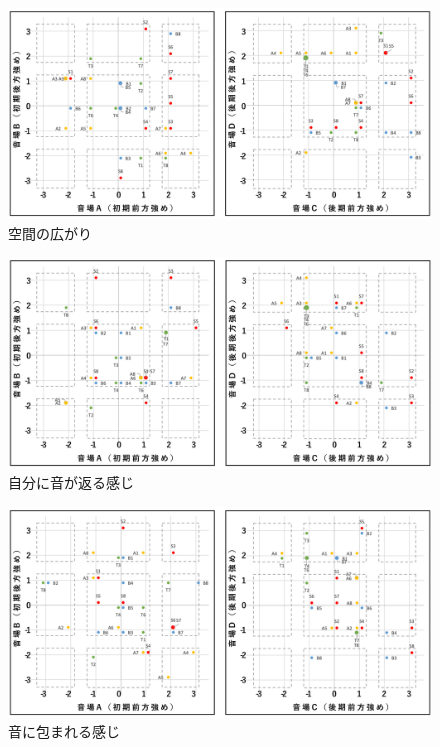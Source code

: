 \documentclass[11pt,a4j]{jreport}
\begin{document}
  \begin{figure}[H]
    \centering
    \includegraphics[width=1\linewidth]{images/subjectiveExp/scat04spacy.png}
    \caption{空間の広がり}
    \label{fig:空間の広がりの散布図}
  \end{figure}

  \begin{figure}[H]
    \centering
    \includegraphics[width=1\linewidth]{images/subjectiveExp/scat06returnSelf.png}
    \caption{自分に音が返る感じ}
    \label{fig:自分に音が返る感じの散布図}
  \end{figure}

  \begin{figure}[H]
    \centering
    \includegraphics[width=1\linewidth]{images/subjectiveExp/scat07surrounded.png}
    \caption{音に包まれる感じ}
    \label{fig:音に包まれる感じの散布図}
  \end{figure}
\end{document}

